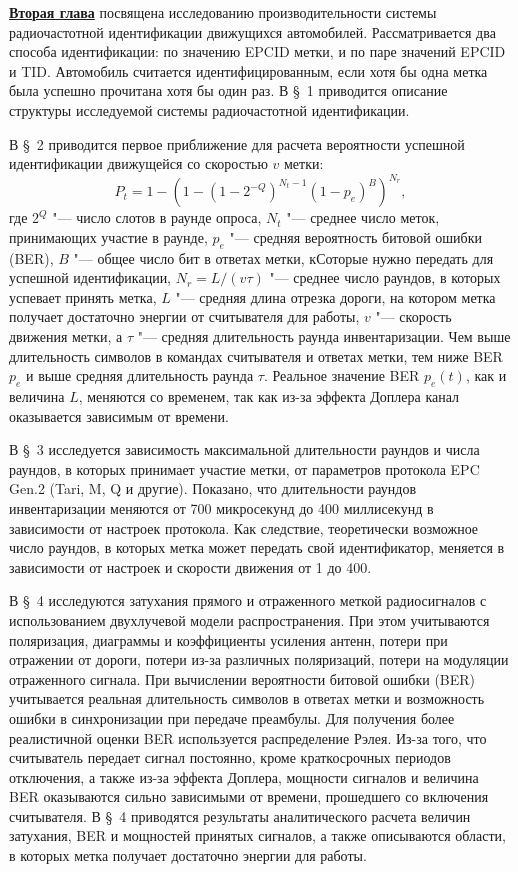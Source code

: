 \underline{\textbf{Вторая глава}} посвящена исследованию производительности системы радиочастотной идентификации движущихся автомобилей. Рассматривается два способа идентификации: по значению EPCID метки, и по паре значений EPCID и TID. Автомобиль считается идентифицированным, если хотя бы одна метка была успешно прочитана хотя бы один раз. В \S~1 приводится описание структуры исследуемой системы радиочастотной идентификации.

В \S~2 приводится первое приближение для расчета вероятности успешной идентификации движущейся со скоростью $v$ метки:
\[
P_t = 1 - \left( 1 - (1 - 2^{-Q})^{N_t-1} (1 - p_e)^B \right)^{N_r},
\]
где $2^Q$ "--- число слотов в раунде опроса, $N_t$ "--- среднее число меток, принимающих участие в раунде, $p_e$ "--- средняя вероятность битовой ошибки (BER), $B$ "--- общее число бит в ответах метки, кСоторые нужно передать для успешной идентификации, $N_r = L / (v \tau)$ "--- среднее число раундов, в которых успевает принять метка, $L$ "--- средняя длина отрезка дороги, на котором метка получает достаточно энергии от считывателя для работы, $v$ "--- скорость движения метки, а $\tau$ "--- средняя длительность раунда инвентаризации. Чем выше длительность символов в командах считывателя и ответах метки, тем ниже BER $p_e$ и выше средняя длительность раунда $\tau$. Реальное значение BER $p_e(t)$, как и величина $L$, меняются со временем, так как из-за эффекта Доплера канал оказывается зависимым от времени.

В \S~3 исследуется зависимость максимальной длительности раундов и числа раундов, в которых принимает участие метки, от параметров протокола EPC Gen.2 (Tari, M, Q и другие). Показано, что длительности раундов инвентаризации меняются от 700 микросекунд до 400 миллисекунд в зависимости от настроек протокола. Как следствие, теоретически возможное число раундов, в которых метка может передать свой идентификатор, меняется в зависимости от настроек и скорости движения от 1 до 400.

В \S~4 исследуются затухания прямого и отраженного меткой радиосигналов с использованием двухлучевой модели распространения. При этом учитываются поляризация, диаграммы и коэффициенты усиления антенн, потери при отражении от дороги, потери из-за различных поляризаций, потери на модуляции отраженного сигнала. При вычислении вероятности битовой ошибки (BER) учитывается реальная длительность символов в ответах метки и возможность ошибки в синхронизации при передаче преамбулы. Для получения более реалистичной оценки BER используется распределение Рэлея. Из-за того, что считыватель передает сигнал постоянно, кроме краткосрочных периодов отключения, а также из-за эффекта Доплера, мощности сигналов и величина BER оказываются сильно зависимыми от времени, прошедшего со включения считывателя. В \S~4 приводятся результаты аналитического расчета величин затухания, BER и мощностей принятых сигналов, а также описываются области, в которых метка получает достаточно энергии для работы.

